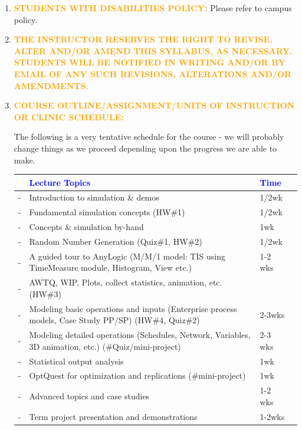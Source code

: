 \documentclass{article}
\begin{document}
\begin{enumerate}

\item \textcolor{orange}{\bf STUDENTS WITH DISABILITIES POLICY:} Please refer to campus policy.


\item   \textcolor{orange}{\bf  THE INSTRUCTOR RESERVES THE RIGHT TO REVISE, ALTER AND/OR AMEND THIS SYLLABUS, AS NECESSARY.  STUDENTS WILL BE NOTIFIED IN WRITING AND/OR BY EMAIL OF ANY SUCH REVISIONS, ALTERATIONS AND/OR AMENDMENTS.}
\newpage
\item \textcolor{orange}{\bf COURSE OUTLINE/ASSIGNMENT/UNITS OF
  INSTRUCTION OR CLINIC SCHEDULE:}

The following is a very tentative schedule for the course - we will
probably change things as we proceed depending upon the progress we
are able to make.
\vskip 0.25in
{
\centering
\begin{tabular}[c]{llll|}
\hline
\textcolor{blue}{} & \textcolor{blue}{Lecture Topics} & \textcolor{blue}{Time}\\
\hline
- & Introduction to simulation \& demos  & 1/2wk\\ 
- & Fundamental simulation concepts (HW\#1)  & 1/2wk\\
- & Concepts \& simulation by-hand & 1wk \\
- & Random Number Generation (Quiz\#1, HW\#2) & 1/2wk \\
- & A guided tour to AnyLogic (M/M/1 model: TIS using TimeMeasure module, Histogram, View etc.) & 1-2 wks \\
- & AWTQ, WIP, Plots, collect statistics, animation, etc. (HW\#3) & \\
- & Modeling basic operations and inputs (Enterprise process models, Case Study PP/SP) (HW\#4, Quiz\#2) & 2-3wks\\
- & Modeling detailed operations (Schedules, Network, Variables, 3D animation, etc.) (\#Quiz/mini-project) & 2-3 wks\\
- & Statistical output analysis & 1wk\\
- & OptQuest for optimization and replications (\#mini-project) & 1wk\\
- & Advanced topics and case studies & 1-2 wks\\
- & Term project presentation and demonstrations & 1-2wks\\
\hline
\end{tabular}
}










\end{enumerate}
\end{document}
